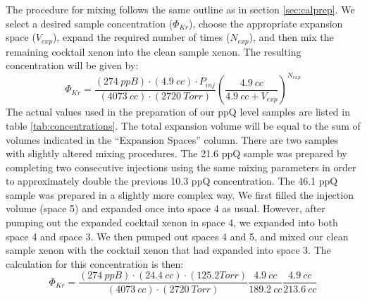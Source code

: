 The procedure for mixing follows the same outline as in section \ref{sec:calprep}. We select a desired sample concentration ($\Phi_{Kr}$), choose the appropriate expansion space ($V_{exp}$), expand the required number of times ($N_{exp}$), and then mix the remaining cocktail xenon into the clean sample xenon. The resulting concentration will be given by:
\begin{equation}
\Phi_{Kr}=\frac{(274 \ ppB)\cdot (4.9 \ cc)\cdot P_{inj}}{(4073 \ cc)\cdot (2720 \ Torr)}\left(\frac{4.9 \ cc}{4.9 \ cc + V_{exp}}\right)^{N_{exp}}
\end{equation}
The actual values used in the preparation of our ppQ level samples are listed in table \ref{tab:concentrations}. The total expansion volume will be equal to the sum of volumes indicated in the ``Expansion Spaces'' column. There are two samples with slightly altered mixing procedures. The 21.6 ppQ sample was prepared by completing two consecutive injections using the same mixing parameters in order to approximately double the previous 10.3 ppQ concentration. The 46.1 ppQ sample was prepared in a slightly more complex way. We first filled the injection volume (space 5) and expanded once into space 4 as usual. However, after pumping out the expanded cocktail xenon in space 4, we expanded into both space 4 and space 3. We then pumped out spaces 4 and 5, and mixed our clean sample xenon with the cocktail xenon that had expanded into space 3. The calculation for this concentration is then:
\begin{equation}
\Phi_{Kr}=\frac{(274 \ ppB)\cdot ( 24.4 \ cc)\cdot (125.2 Torr)}{(4073 \ cc)\cdot (2720 \ Torr)}\frac{4.9 \ cc}{189.2 \ cc }\frac{4.9 \ cc}{213.6 \ cc }
\end{equation}


